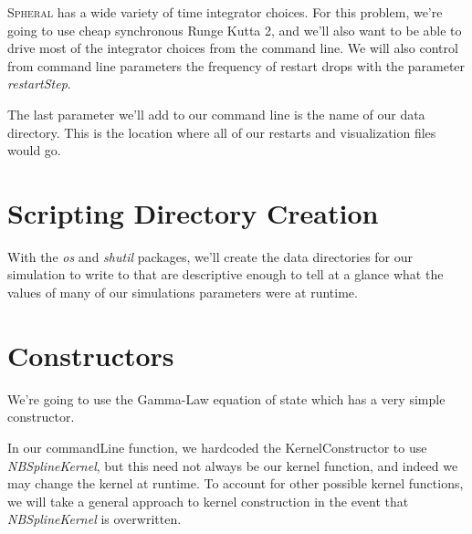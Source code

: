 \documentclass[11pt]{memoir}
\begin{document}


\textsc{Spheral} has a wide variety of time integrator choices. 
For this problem, we're going to use cheap synchronous Runge Kutta 2, and we'll also want to be able to drive most of the integrator choices from the command line. 
We will also control from command line parameters the frequency of restart drops with the parameter \textit{restartStep}.



The last parameter we'll add to our command line is the name of our data directory. 
This is the location where all of our restarts and visualization files would go.



\section{Scripting Directory Creation}

With the \textit{os} and \textit{shutil} packages, we'll create the data directories for our simulation to write to that are descriptive enough to tell at a glance what the values of many of our simulations parameters were at runtime.



\section{Constructors}

We're going to use the Gamma-Law equation of state which has a very simple constructor.



In our commandLine function, we hardcoded the KernelConstructor to use \textit{NBSplineKernel}, but this need not always be our kernel function, and indeed we may change the kernel at runtime.
To account for other possible kernel functions, we will take a general approach to kernel construction in the event that \textit{NBSplineKernel} is overwritten.


\end{document}
